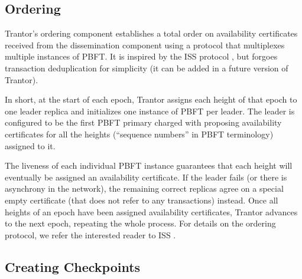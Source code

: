 \documentclass{article}
\begin{document}
\subsection{Ordering}

Trantor’s ordering component establishes a total order on availability certificates
received from the dissemination component using a protocol that multiplexes multiple instances of PBFT.
It is inspired by the ISS protocol \cite{iss}, but forgoes transaction deduplication for simplicity
(it can be added in a future version of Trantor).

In short, at the start of each epoch, Trantor assigns each height of that epoch to one leader replica
and initializes one instance of PBFT per leader.
The leader is configured to be the first PBFT primary charged with proposing availability certificates
for all the heights (“sequence numbers” in PBFT terminology) assigned to it.

The liveness of each individual PBFT instance guarantees
that each height will eventually be assigned an availability certificate.
If the leader fails (or there is asynchrony in the network),
the remaining correct replicas agree on a special empty certificate (that does not refer to any transactions) instead. Once all heights of an epoch have been assigned availability certificates,
Trantor advances to the next epoch, repeating the whole process.
For details on the ordering protocol, we refer the interested reader to ISS \cite{iss}.

\subsection{Creating Checkpoints}
\end{document}
